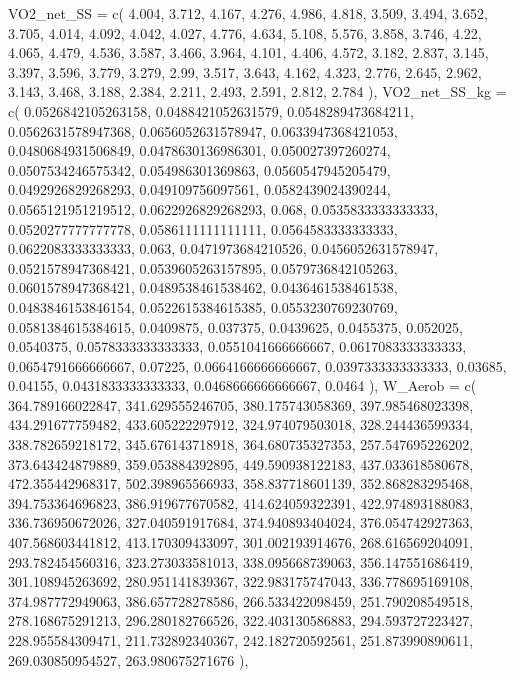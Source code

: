 \documentclass[
  letterpaper,
  DIV=11]{scrartcl}
\newenvironment{Shaded}{\begin{snugshade}}{\end{snugshade}}
\newcommand{\NormalTok}[1]{\textcolor[rgb]{0.00,0.23,0.31}{#1}}
\begin{document}
\begin{Shaded}
\begin{Highlighting}[]
\NormalTok{  \textasciigrave{}VO2\_net\_SS\textasciigrave{} = c( 4.004, 3.712, 4.167, 4.276, 4.986, 4.818, 3.509, 3.494, 3.652, 3.705, 4.014, 4.092, 4.042, 4.027, 4.776, 4.634, 5.108, 5.576, 3.858, 3.746, 4.22, 4.065, 4.479, 4.536, 3.587, 3.466, 3.964, 4.101, 4.406, 4.572, 3.182, 2.837, 3.145, 3.397, 3.596, 3.779, 3.279, 2.99, 3.517, 3.643, 4.162, 4.323, 2.776, 2.645, 2.962, 3.143, 3.468, 3.188, 2.384, 2.211, 2.493, 2.591, 2.812, 2.784 ),}
\NormalTok{  \textasciigrave{}VO2\_net\_SS\_kg\textasciigrave{} = c( 0.0526842105263158, 0.0488421052631579, 0.0548289473684211, 0.0562631578947368, 0.0656052631578947, 0.0633947368421053, 0.0480684931506849, 0.0478630136986301, 0.050027397260274, 0.0507534246575342, 0.054986301369863, 0.0560547945205479, 0.0492926829268293, 0.049109756097561, 0.0582439024390244, 0.0565121951219512, 0.0622926829268293, 0.068, 0.0535833333333333, 0.0520277777777778, 0.0586111111111111, 0.0564583333333333, 0.0622083333333333, 0.063, 0.0471973684210526, 0.0456052631578947, 0.0521578947368421, 0.0539605263157895, 0.0579736842105263, 0.0601578947368421, 0.0489538461538462, 0.0436461538461538, 0.0483846153846154, 0.0522615384615385, 0.0553230769230769, 0.0581384615384615, 0.0409875, 0.037375, 0.0439625, 0.0455375, 0.052025, 0.0540375, 0.0578333333333333, 0.0551041666666667, 0.0617083333333333, 0.0654791666666667, 0.07225, 0.0664166666666667, 0.0397333333333333, 0.03685, 0.04155, 0.0431833333333333, 0.0468666666666667, 0.0464 ),}
\NormalTok{  \textasciigrave{}W\_Aerob\textasciigrave{} = c( 364.789166022847, 341.629555246705, 380.175743058369, 397.985468023398, 434.291677759482, 433.605222297912, 324.974079503018, 328.244436599334, 338.782659218172, 345.676143718918, 364.680735327353, 257.547695226202, 373.643424879889, 359.053884392895, 449.590938122183, 437.033618580678, 472.355442968317, 502.398965566933, 358.837718601139, 352.868283295468, 394.753364696823, 386.919677670582, 414.624059322391, 422.974893188083, 336.736950672026, 327.040591917684, 374.940893404024, 376.054742927363, 407.568603441812, 413.170309433097, 301.002193914676, 268.616569204091, 293.782454560316, 323.273033581013, 338.095668739063, 356.147551686419, 301.108945263692, 280.951141839367, 322.983175747043, 336.778695169108, 374.987772949063, 386.657728278586, 266.533422098459, 251.790208549518, 278.168675291213, 296.280182766526, 322.403130586883, 294.593727223427, 228.955584309471, 211.732892340367, 242.182720592561, 251.873990890611, 269.030850954527, 263.980675271676 ),}

\end{Highlighting}
\end{Shaded}
\end{document}
